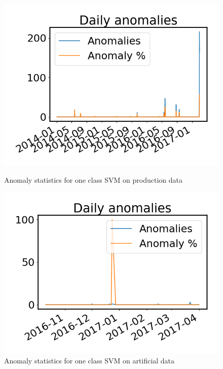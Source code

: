         \begin{figure}[h!]
            \begin{minipage}[b]{0.49\linewidth}
                \centering
                \includegraphics[width=\textwidth]{report/figures/analysis/plant2_train_long/daily_svm_outliers_production_small.png}
                \caption{Anomaly statistics for one class SVM on production data}
                \label{fig:svm_3_outliers_stats_production}
            \end{minipage}
            \hfill\vline\hfill
            \begin{minipage}[b]{0.49\linewidth}
                \centering
                \includegraphics[width=\textwidth]{report/figures/analysis/plant2_train_long/daily_svm_outliers_artificial_small.png}
                \caption{Anomaly statistics for one class SVM on artificial data}
                \label{fig:svm_3_outliers_stats_artificial}
            \end{minipage}
        \end{figure}
        
